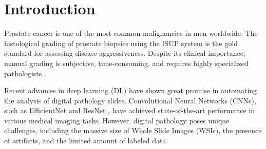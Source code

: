 \documentclass[10pt,conference]{IEEEtran}
\newcommand{\cmtid}{99999}
\begin{document}
\else
  \author{SIBGRAPI Paper ID: \cmtid \\ }
  \linenumbers
\fi


\maketitle

\begin{abstract}
The accurate grading of prostate cancer in whole-slide images (WSIs) is essential for patient prognosis and treatment planning. However, the International Society of Urological Pathology (ISUP) grading system suffers from significant inter-observer variability. In this work, we propose an automated classification system based on the EfficientNet architecture. We investigate the impact of different model scales and propose a novel data filtering strategy based on Shannon entropy to remove non-informative and noisy patches from the training set. Our results demonstrate that the EfficientNet-B0 model, combined with entropy filtering, achieves a Quadratic Weighted Kappa (QWK) of 0.8730, outperforming larger architectures and the baseline model. We also evaluate the impact of alternative color spaces and self-attention mechanisms, finding that standard RGB and local attention (SE blocks) remain the most effective for this task.
\end{abstract}





\IEEEpeerreviewmaketitle



\section{Introduction}
Prostate cancer is one of the most common malignancies in men worldwide. The histological grading of prostate biopsies using the ISUP system is the gold standard for assessing disease aggressiveness. Despite its clinical importance, manual grading is subjective, time-consuming, and requires highly specialized pathologists \cite{bulten2020automated}.

Recent advances in deep learning (DL) have shown great promise in automating the analysis of digital pathology slides. Convolutional Neural Networks (CNNs), such as EfficientNet \cite{tan2019efficientnet} and ResNet \cite{he2016deep}, have achieved state-of-the-art performance in various medical imaging tasks. However, digital pathology poses unique challenges, including the massive size of Whole Slide Images (WSIs), the presence of artifacts, and the limited amount of labeled data.
\end{document}
